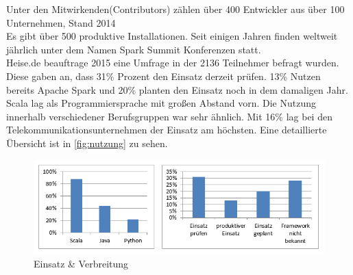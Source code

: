 Unter den Mitwirkenden(Contributors) zählen über 400 Entwickler aus über 100 Unternehmen, Stand 2014 \\
Es gibt über 500 produktive Installationen. %
Seit einigen Jahren finden weltweit jährlich unter dem Namen Spark Summit Konferenzen statt.\\
Heise.de beauftrage 2015 eine Umfrage in der 2136 Teilnehmer befragt wurden. Diese gaben an, dass 31\% Prozent den Einsatz derzeit prüfen. 13\% Nutzen bereits Apache Spark und 20\% planten den Einsatz noch in dem damaligen Jahr.
Scala lag als Programmiersprache mit großen Abstand vorn. Die Nutzung innerhalb verschiedener Berufsgruppen war sehr ähnlich. Mit 16\%  lag bei den Telekommunikationsunternehmen der Einsatz am höchsten. Eine detaillierte Übersicht ist in \autoref{fig:nutzung} zu sehen.
\begin{figure}[h]
  \centering
  \includegraphics[width=\textwidth]{./excel/Nutzung.png}
  \caption{Einsatz \& Verbreitung}\label{fig:nutzung}
\end{figure}



